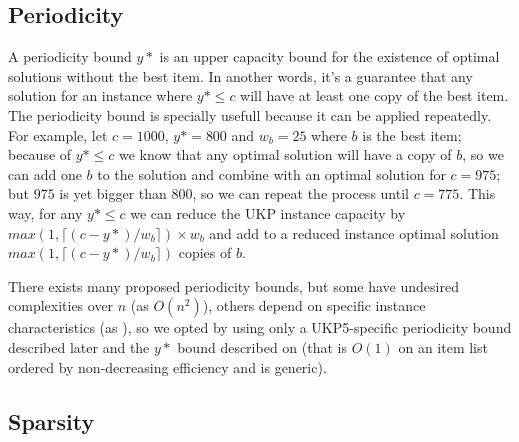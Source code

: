 \documentclass[runningheads,a4paper]{llncs}
\begin{document}


\subsection{Periodicity}

A periodicity bound \(y*\) is an upper capacity bound for the existence of optimal solutions without the best item. In another words, it's a guarantee that any solution for an instance where \(y* \leq c\) will have at least one copy of the best item. The periodicity bound is specially usefull because it can be applied repeatedly. For example, let \(c = 1000\), \(y* = 800\) and \(w_b = 25\) where \(b\) is the best item; because of \(y* \leq c\) we know that any optimal solution will have a copy of \(b\), so we can add one \(b\) to the solution and combine with an optimal solution for \(c = 975\); but \(975\) is yet bigger than \(800\), so we can repeat the process until \(c = 775\). This way, for any \(y* \leq c\) we can reduce the UKP instance capacity by \(max(1, \lceil(c-y*)/w_b\rceil)\times w_b\) and add to a reduced instance optimal solution \(max(1, \lceil(c-y*)/w_b\rceil)\) copies of \(b\).

There exists many proposed periodicity bounds, but some have undesired complexities over \(n\) (as \(O(n^2)\)\cite{CBADBOUND}), others depend on specific instance characteristics (as \cite{BADBOUND2}\cite{CPYA}), so we opted by using only a UKP5-specific periodicity bound described later and the \(y*\) bound described on \cite[p. 223]{CGAR} (that is \(O(1)\) on an item list ordered by non-decreasing efficiency and is generic).

\subsection{Sparsity}

\end{document}
